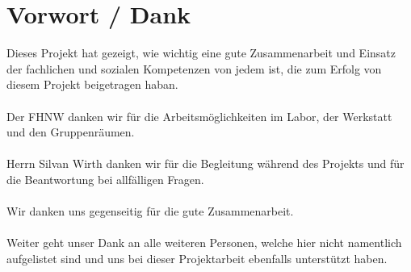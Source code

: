 \section*{Vorwort / Dank}

Dieses Projekt hat gezeigt, wie wichtig eine gute Zusammenarbeit und Einsatz der fachlichen und sozialen Kompetenzen von jedem ist, die zum Erfolg von diesem Projekt beigetragen haban. \\
\\
Der FHNW danken wir für die Arbeitsmöglichkeiten im Labor, der Werkstatt und den Gruppenräumen.\\
\\
Herrn Silvan Wirth danken wir für die Begleitung während des Projekts und für die Beantwortung bei allfälligen Fragen.\\
\\
Wir danken uns gegenseitig für die gute Zusammenarbeit.\\
\\
Weiter geht unser Dank an alle weiteren Personen, welche hier nicht namentlich aufgelistet sind und uns bei dieser Projektarbeit ebenfalls unterstützt haben.

